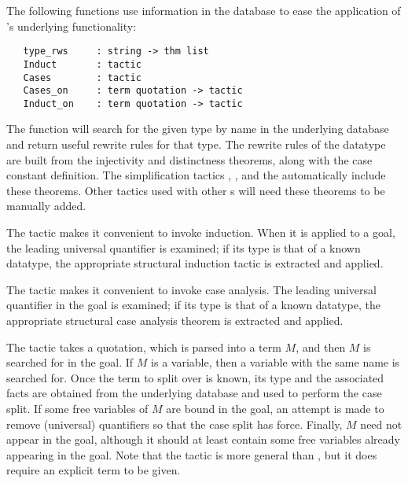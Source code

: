 {The following functions use information in the database to ease the
application of \HOL's underlying functionality:

\begin{verbatim}
   type_rws     : string -> thm list
   Induct       : tactic
   Cases        : tactic
   Cases_on     : term quotation -> tactic
   Induct_on    : term quotation -> tactic
\end{verbatim}

%
The function  will search for the given type by name in
the underlying  database and return useful rewrite rules
for that type. The rewrite rules of the datatype are built from the
injectivity and distinctness theorems, along with the case constant
definition. The simplification tactics , ,
and the \simpset{}  automatically include these
theorems.  Other tactics used with other \simpset{}s will need these
theorems to be manually added.

%
The  tactic makes it convenient to invoke induction. When
it is applied to a goal, the leading universal quantifier is examined;
if its type is that of a known datatype, the appropriate structural
induction tactic is extracted and applied.

The  tactic makes it convenient to invoke case
analysis. The leading universal quantifier in the goal is examined; if
its type is that of a known datatype, the appropriate structural
case analysis theorem is extracted and applied.

The  tactic takes a quotation, which is
parsed into a term $M$, and then $M$ is searched for in the goal. If $M$
is a variable, then a variable with the same name is searched for. Once
the term to split over is known, its type and the associated facts are
obtained from the underlying database and used to perform the case
split. If some free variables of $M$ are bound in the goal, an attempt
is made to remove (universal) quantifiers so that the case split has
force. Finally, $M$ need not appear in the goal, although it should at
least contain some free variables already appearing in the goal. Note
that the  tactic is more general than , but
it does require an explicit term to be given.

}

